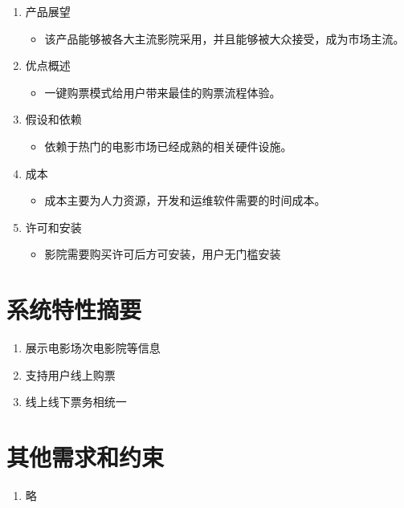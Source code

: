 \documentclass[a4paper]{article}
\begin{document}
\begin{enumerate}[resume]
  \item 产品展望
  \begin{itemize}
    \item 该产品能够被各大主流影院采用，并且能够被大众接受，成为市场主流。
  \end{itemize}
  \item 优点概述
  \begin{itemize}
    \item 一键购票模式给用户带来最佳的购票流程体验。
  \end{itemize}
  \item 假设和依赖
  \begin{itemize}
    \item 依赖于热门的电影市场已经成熟的相关硬件设施。
  \end{itemize}
  \item 成本
  \begin{itemize}
    \item 成本主要为人力资源，开发和运维软件需要的时间成本。
  \end{itemize}
  \item 许可和安装
  \begin{itemize}
    \item 影院需要购买许可后方可安装，用户无门槛安装
  \end{itemize}
\end{enumerate}

\section{系统特性摘要}
\begin{enumerate}[resume]
  \item 展示电影场次电影院等信息
  \item 支持用户线上购票
  \item 线上线下票务相统一
\end{enumerate}

\section{其他需求和约束}
\begin{enumerate}[resume]
  \item 略
\end{enumerate}
\end{document}

